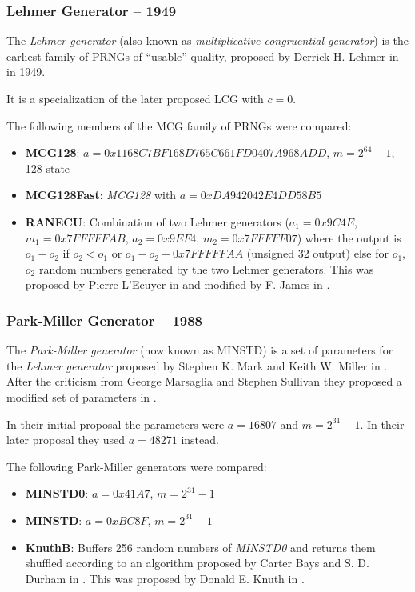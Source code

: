 \subsubsection[Lehmer Generator (MCG) -- 1949]{Lehmer Generator -- 1949} \label{subsubsec:mcg}

    The \emph{Lehmer generator} (also known as \emph{multiplicative congruential generator}) is the earliest family of PRNGs of ``usable'' quality, proposed by Derrick H. Lehmer in \cite{Lehman:1951} in 1949.

    It is a specialization of the later proposed LCG with $c = 0$.

    The following members of the MCG family of PRNGs were compared:
    \begin{itemize}
		\itemsep0em
        \item \textbf{MCG128}:     $a = 0x1168C7BF168D765C661FD0407A968ADD$, $m = 2^{64} - 1$, \SI{128}{\bit} state
        \item \textbf{MCG128Fast}: \textit{MCG128} with $a = 0xDA942042E4DD58B5$
        \item \textbf{RANECU}: Combination of two Lehmer generators ($a_1 = 0x9C4E$, $m_1 = 0x7FFFFFAB$, $a_2 = 0x9EF4$, $m_2 = 0x7FFFFF07$) where the output is $o_1 - o_2$ if $o_2 < o_1$ or $o_1 - o_2 + 0x7FFFFFAA$ (unsigned \SI{32}{\bit} output) else for $o_1$, $o_2$ random numbers generated by the two Lehmer generators. This was proposed by Pierre L'Ecuyer in \cite{LEcuyer:1988} and modified by F. James in \cite{James:1990}.
    \end{itemize}

\subsubsection[Park-Miller Generator -- 1988]{Park-Miller Generator -- 1988} \label{subsubsec:minstd}

    The \emph{Park-Miller generator} (now known as MINSTD) is a set of parameters for the \emph{Lehmer generator} proposed by Stephen K. Mark and Keith W. Miller in \cite{Park:1988}. After the criticism from George Marsaglia and Stephen Sullivan they proposed a modified set of parameters in \cite{Park:1993}.

    In their initial proposal the parameters were $a = 16807$ and $m = 2^{31} - 1$. In their later proposal they used $a = 48271$ instead.

    The following Park-Miller generators were compared:
    \begin{itemize}
		\itemsep0em
        \item \textbf{MINSTD0}: $a = 0x41A7$, $m = 2^{31} - 1$
        \item \textbf{MINSTD}:  $a = 0xBC8F$, $m = 2^{31} - 1$
        \item \textbf{KnuthB}: Buffers 256 random numbers of \textit{MINSTD0} and returns them shuffled according to an algorithm proposed by Carter Bays and S. D. Durham in \cite{Bays:1976}. This was proposed by Donald E. Knuth in \cite{Knuth:1981}.
    \end{itemize}

